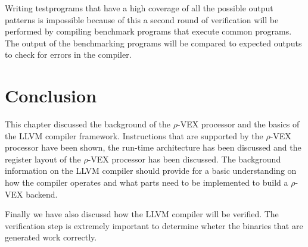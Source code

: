 Writing testprograms that have a high coverage of all the possible output patterns is impossible because of this a second round of verification will be performed by compiling benchmark programs that execute common programs. The output of the benchmarking programs will be compared to expected outputs to check for errors in the compiler.

\section{Conclusion}
This chapter discussed the background of the $\rho$-VEX processor and the basics of the LLVM compiler framework. Instructions that are supported by the $\rho$-VEX processor have been shown, the run-time architecture has been discussed and the register layout of the $\rho$-VEX processor has been discussed. The background information on the LLVM compiler should provide for a basic understanding on how the compiler operates and what parts need to be implemented to build a $\rho$-VEX backend.

Finally we have also discussd how the LLVM compiler will be verified. The verification step is extremely important to determine wheter the binaries that are generated work correctly.

\acresetall
